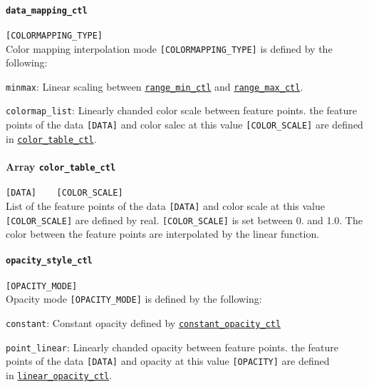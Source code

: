 \paragraph{\tt data\_mapping\_ctl}
\label{href_t:data_mapping_ctl}
\verb|[COLORMAPPING_TYPE]| \\
Color mapping interpolation mode \verb|[COLORMAPPING_TYPE]| is defined by the following:
\begin{description}
\item{{\tt minmax}: } Linear scaling between \hyperref[href_t:range_min_ctl]{\tt range\_min\_ctl} and \hyperref[href_t:range_max_ctl]{\tt range\_max\_ctl}.
\item{{\tt colormap\_list}: } Linearly chanded color scale between feature points. the feature points of the data \verb|[DATA]| and color salec at this value \verb|[COLOR_SCALE]| are defined \\ 
in \hyperref[href_t:linear_opacity_ctl]{\tt color\_table\_ctl}.
\end{description}

\paragraph{Array {\tt color\_table\_ctl}}
\label{href_t:color_table_ctl}
\verb|[DATA]    [COLOR_SCALE]| \\
List of the feature points of the data \verb|[DATA]| and color scale at this value \verb|[COLOR_SCALE]| are defined by real. \verb|[COLOR_SCALE]| is set between 0. and 1.0. The color between the feature points are interpolated by the linear function.

\paragraph{\tt opacity\_style\_ctl}
\label{href_t:opacity_style_ctl}
\verb|[OPACITY_MODE]| \\
Opacity mode \verb|[OPACITY_MODE]| is defined by the following:
\begin{description}
\item{{\tt constant}: } Constant opacity defined by \hyperref[href_t:constant_opacity_ctl]{\tt constant\_opacity\_ctl}
\item{{\tt point\_linear}: } Linearly chanded opacity between feature points. the feature points of the data \verb|[DATA]| and opacity at this value \verb|[OPACITY]| are defined \\ 
in \hyperref[href_t:linear_opacity_ctl]{\tt linear\_opacity\_ctl}.
\end{description}

